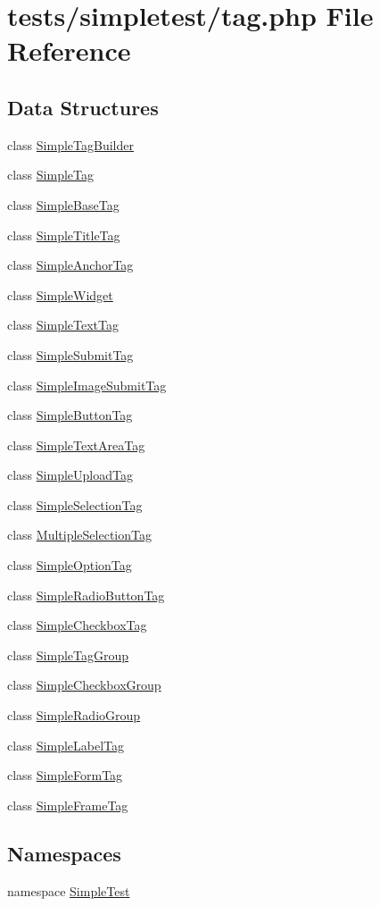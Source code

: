 \hypertarget{tag_8php}{\section{tests/simpletest/tag.php File Reference}
\label{tag_8php}
}
\subsection*{Data Structures}
\begin{DoxyCompactItemize}
\item 
class \hyperlink{class_simple_tag_builder}{Simple\-Tag\-Builder}
\item 
class \hyperlink{class_simple_tag}{Simple\-Tag}
\item 
class \hyperlink{class_simple_base_tag}{Simple\-Base\-Tag}
\item 
class \hyperlink{class_simple_title_tag}{Simple\-Title\-Tag}
\item 
class \hyperlink{class_simple_anchor_tag}{Simple\-Anchor\-Tag}
\item 
class \hyperlink{class_simple_widget}{Simple\-Widget}
\item 
class \hyperlink{class_simple_text_tag}{Simple\-Text\-Tag}
\item 
class \hyperlink{class_simple_submit_tag}{Simple\-Submit\-Tag}
\item 
class \hyperlink{class_simple_image_submit_tag}{Simple\-Image\-Submit\-Tag}
\item 
class \hyperlink{class_simple_button_tag}{Simple\-Button\-Tag}
\item 
class \hyperlink{class_simple_text_area_tag}{Simple\-Text\-Area\-Tag}
\item 
class \hyperlink{class_simple_upload_tag}{Simple\-Upload\-Tag}
\item 
class \hyperlink{class_simple_selection_tag}{Simple\-Selection\-Tag}
\item 
class \hyperlink{class_multiple_selection_tag}{Multiple\-Selection\-Tag}
\item 
class \hyperlink{class_simple_option_tag}{Simple\-Option\-Tag}
\item 
class \hyperlink{class_simple_radio_button_tag}{Simple\-Radio\-Button\-Tag}
\item 
class \hyperlink{class_simple_checkbox_tag}{Simple\-Checkbox\-Tag}
\item 
class \hyperlink{class_simple_tag_group}{Simple\-Tag\-Group}
\item 
class \hyperlink{class_simple_checkbox_group}{Simple\-Checkbox\-Group}
\item 
class \hyperlink{class_simple_radio_group}{Simple\-Radio\-Group}
\item 
class \hyperlink{class_simple_label_tag}{Simple\-Label\-Tag}
\item 
class \hyperlink{class_simple_form_tag}{Simple\-Form\-Tag}
\item 
class \hyperlink{class_simple_frame_tag}{Simple\-Frame\-Tag}
\end{DoxyCompactItemize}
\subsection*{Namespaces}
\begin{DoxyCompactItemize}
\item 
namespace \hyperlink{namespace_simple_test}{Simple\-Test}
\end{DoxyCompactItemize}
